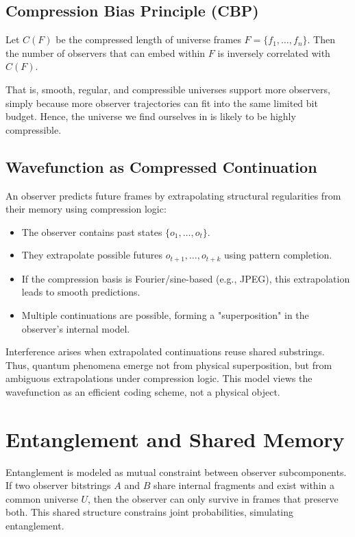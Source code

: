 \documentclass[12pt]{article}
\begin{document}
\subsection{Compression Bias Principle (CBP)}

Let $C(F)$ be the compressed length of universe frames $F = \{f_1, \ldots, f_n\}$. Then the number of observers that can embed within $F$ is inversely correlated with $C(F)$.

That is, smooth, regular, and compressible universes support more observers, simply because more observer trajectories can fit into the same limited bit budget. Hence, the universe we find ourselves in is likely to be highly compressible.

\subsection{Wavefunction as Compressed Continuation}

An observer predicts future frames by extrapolating structural regularities from their memory using compression logic:

\begin{itemize}
    \item The observer contains past states $\{o_1, \ldots, o_t\}$.
    \item They extrapolate possible futures $o_{t+1}, \ldots, o_{t+k}$ using pattern completion.
    \item If the compression basis is Fourier/sine-based (e.g., JPEG), this extrapolation leads to smooth predictions.
    \item Multiple continuations are possible, forming a "superposition" in the observer's internal model.
\end{itemize}

Interference arises when extrapolated continuations reuse shared substrings. Thus, quantum phenomena emerge not from physical superposition, but from ambiguous extrapolations under compression logic. This model views the wavefunction as an efficient coding scheme, not a physical object.

\section{Entanglement and Shared Memory}

Entanglement is modeled as mutual constraint between observer subcomponents. If two observer bitstrings $A$ and $B$ share internal fragments and exist within a common universe $U$, then the observer can only survive in frames that preserve both. This shared structure constrains joint probabilities, simulating entanglement.
\end{document}
